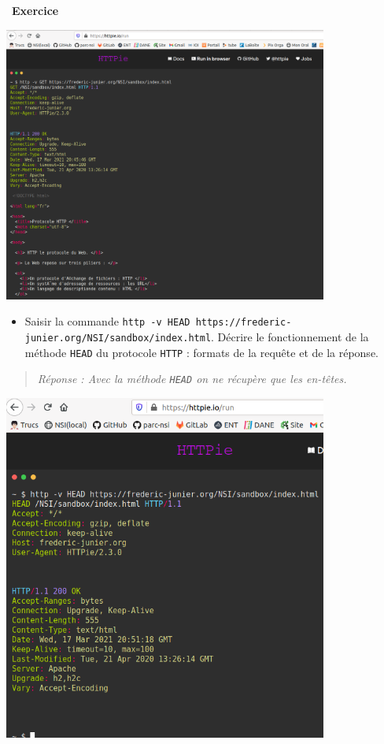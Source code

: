 \documentclass[
  11pt,
]{article}
\newcommand{\passthrough}[1]{#1}
\providecommand{\tightlist}{%
  \setlength{\itemsep}{0pt}\setlength{\parskip}{0pt}}
\newcounter{exo}
\newenvironment{exercice}[1]
{\par \medskip   \addtocounter{exo}{1} \noindent  
\begin{bclogo}[arrondi =0.1,   noborder = true, logo=\bccrayon, marge=4]{~\textbf{Exercice} \textbf{\theexo} {\itshape #1} }  \par}
{
\end{bclogo}
 \par \bigskip }
\begin{document}
\begin{exercice}{}
\begin{enumerate}
  \includegraphics[width=0.8\textwidth,height=\textheight]{images/http_pie1.png}\\

  \begin{itemize}
  \tightlist
  \item
    Saisir la commande
    \passthrough{\lstinline!http -v HEAD https://frederic-junier.org/NSI/sandbox/index.html!}.
    Décrire le fonctionnement de la méthode
    \passthrough{\lstinline!HEAD!} du protocole
    \passthrough{\lstinline!HTTP!} : formats de la requête et de la
    réponse.
  \end{itemize}

  \begin{quote}
  \emph{Réponse : Avec la méthode \passthrough{\lstinline!HEAD!} on ne
  récupère que les en-têtes.}
  \end{quote}

  \includegraphics[width=0.8\textwidth,height=\textheight]{images/http_pie2.png}\\


\end{enumerate}
\end{exercice}
\end{document}
